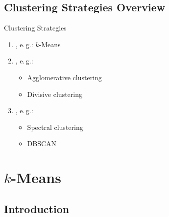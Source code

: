 \subsection{Clustering Strategies Overview}

\begin{frame}{Clustering Strategies}{}
	\begin{enumerate}
		\item {}, e.\,g.: $k$-Means
		\item {}, e.\,g.:
		\begin{itemize}
			\item Agglomerative clustering
			\item Divisive clustering
		\end{itemize}
		\item {}, e.\,g.:
		\begin{itemize}
			\item Spectral clustering
			\item DBSCAN
		\end{itemize}
	\end{enumerate}
\end{frame}


\section{$k$-Means}

\subsection{Introduction}

